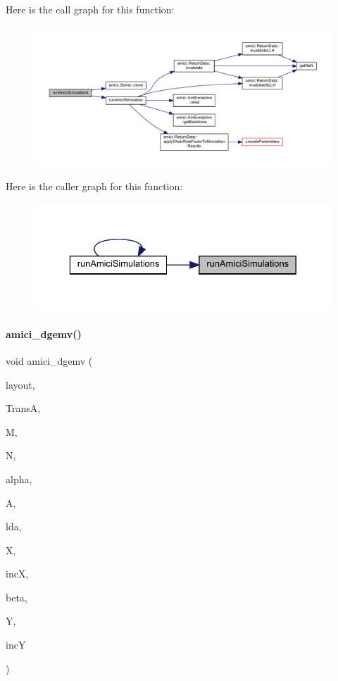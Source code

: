 Here is the call graph for this function\+:
\nopagebreak
\begin{figure}[H]
\begin{center}
\leavevmode
\includegraphics[width=350pt]{namespaceamici_a99419051271016d17c4b743a7869580c_cgraph}
\end{center}
\end{figure}
Here is the caller graph for this function\+:
\nopagebreak
\begin{figure}[H]
\begin{center}
\leavevmode
\includegraphics[width=329pt]{namespaceamici_a99419051271016d17c4b743a7869580c_icgraph}
\end{center}
\end{figure}
\mbox{\label{namespaceamici_aaadff5ccb22e546f3590e15f5ee30c1c}} 
\paragraph{\texorpdfstring{amici\_dgemv()}{amici\_dgemv()}}
{\footnotesize\ttfamily void amici\+\_\+dgemv (\begin{DoxyParamCaption}\item[{\mbox{\hyperlink{namespaceamici_a3ec6460bb4e7f6100a15d18627a3ff3e}{B\+L\+A\+S\+Layout}}}]{layout,  }\item[{\mbox{\hyperlink{namespaceamici_a0f0ec77c6c8f48d9c5cb50d54899afae}{B\+L\+A\+S\+Transpose}}}]{TransA,  }\item[{const int}]{M,  }\item[{const int}]{N,  }\item[{const double}]{alpha,  }\item[{const double $\ast$}]{A,  }\item[{const int}]{lda,  }\item[{const double $\ast$}]{X,  }\item[{const int}]{incX,  }\item[{const double}]{beta,  }\item[{double $\ast$}]{Y,  }\item[{const int}]{incY }\end{DoxyParamCaption})}

